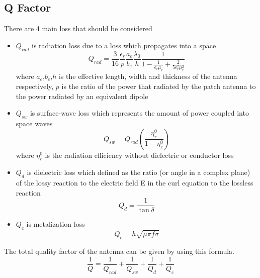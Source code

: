 \documentclass[11pt,a4paper]{article}
\begin{document}
    \subsection{Q Factor}
      \indent There are 4 main loss that should be considered\cite{NoK:05}
      \begin{itemize}
        \item $Q_{rad}$ is radiation loss due to a loss which propagates into a space
          \begin{equation}
              Q_{rad} = \frac{3}{16}\frac{\epsilon_r}{p}\frac{a_e}{b_e}\frac{\lambda_0}{h}\frac{1}{1-\frac{1}{\epsilon_r\mu_r}+\frac{2}{5\epsilon_r^2\mu_{r}^2}}
          \end{equation}
          \indent where $a_e$,$b_e$,$h$ is the effective length, width and thickness of the antenna respectively,
          $p$ is the ratio of the power that radiated by the patch antenna to the power radiated by an equivalent dipole\cite{NoK:05}
        \item $Q_{sw}$ is surface-wave loss which represents the amount of power coupled into space waves
          \begin{equation}
            Q_{sw} = Q_{rad}(\frac{\eta_r^0}{1-\eta_r^0})
          \end{equation}
          \indent where $\eta_r^0$ is the radiation efficiency without dielectric or conductor loss
        \item $Q_d$ is dielectric loss which defined as the ratio (or angle in a complex plane) of the lossy reaction to the electric field E in the curl equation to the lossless reaction
          \begin{equation}
            Q_d = \frac{1}{\tan\delta}
          \end{equation}
        \item $Q_c$ is metalization loss
        \begin{equation}
          Q_c = h\sqrt{\mu\pi{f}\sigma}
        \end{equation}
      \end{itemize}
      \indent The total quality factor of the antenna can be given by using this formula.
      \begin{equation}
        \frac{1}{Q} = \frac{1}{Q_{rad}} + \frac{1}{Q_{sw}} + \frac{1}{Q_d} + \frac{1}{Q_c}
      \end{equation}
\end{document}
